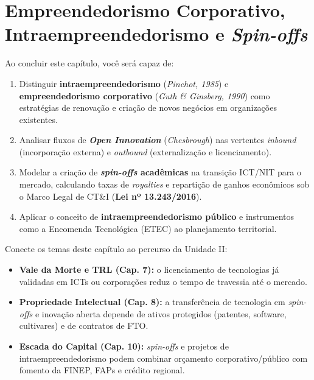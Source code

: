 \chapter{Empreendedorismo Corporativo, Intraempreendedorismo e \textit{Spin-offs}}
\label{cap:11}

\noindent{}

\begin{capObjetivos}
  Ao concluir este capítulo, você será capaz de:
  \begin{enumerate}[leftmargin=1.5em, itemsep=2pt]
    \item Distinguir \textbf{intraempreendedorismo} (\textit{Pinchot, 1985}) e \textbf{empreendedorismo corporativo} (\textit{Guth \& Ginsberg, 1990}) como estratégias de renovação e criação de novos negócios em organizações existentes.
    \item Analisar fluxos de \textbf{\textit{Open Innovation}} (\textit{Chesbrough}) nas vertentes \textit{inbound} (incorporação externa) e \textit{outbound} (externalização e licenciamento).
    \item Modelar a criação de \textbf{\textit{spin-offs} acadêmicas} na transição ICT/NIT para o mercado, calculando taxas de \textit{royalties} e repartição de ganhos econômicos sob o Marco Legal de CT\&I (\textbf{Lei nº 13.243/2016}).
    \item Aplicar o conceito de \textbf{intraempreendedorismo público} e instrumentos como a Encomenda Tecnológica (ETEC) ao planejamento territorial.
  \end{enumerate}
\end{capObjetivos}

\begin{capRevisao}
  Conecte os temas deste capítulo ao percurso da Unidade II:
  \begin{itemize}[leftmargin=1.5em, itemsep=2pt]
    \item \textbf{Vale da Morte e TRL (Cap. 7):} o licenciamento de tecnologias já validadas em ICTs ou corporações reduz o tempo de travessia até o mercado.
    \item \textbf{Propriedade Intelectual (Cap. 8):} a transferência de tecnologia em \textit{spin-offs} e inovação aberta depende de ativos protegidos (patentes, software, cultivares) e de contratos de FTO.
    \item \textbf{Escada do Capital (Cap. 10):} \textit{spin-offs} e projetos de intraempreendedorismo podem combinar orçamento corporativo/público com fomento da FINEP, FAPs e crédito regional.
  \end{itemize}
\end{capRevisao}

